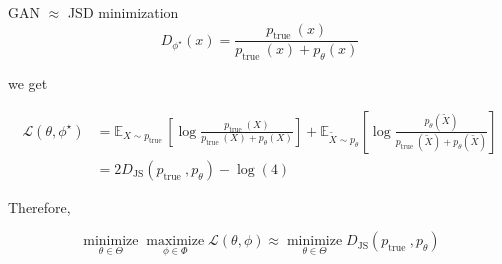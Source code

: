 \begin{frame}[allowframebreaks]
\begin{myconceptblock}{12.17}{GAN $\approx$ JSD minimization}
    $$
    D_{\phi^{\star}}(x)=\frac{p_{\text {true }}(x)}{p_{\text {true }}(x)+p_{\theta}(x)}
    $$

    we get

    $$
    \begin{aligned}
    \mathcal{L}\left(\theta, \phi^{\star}\right) & =\mathbb{E}_{X \sim p_{\text {true }}}\left[\log \frac{p_{\text {true }}(X)}{p_{\text {true }}(X)+p_{\theta}(X)}\right]+\mathbb{E}_{\tilde{X} \sim p_{\theta}}\left[\log \frac{p_{\theta}(\tilde{X})}{p_{\text {true }}(\tilde{X})+p_{\theta}(\tilde{X})}\right] \\
    & =2 D_{\mathrm{JS}}\left(p_{\text {true }}, p_{\theta}\right)-\log (4)
    \end{aligned}
    $$

    Therefore,

    $$
    \underset{\theta \in \Theta}{\operatorname{minimize}} \underset{\phi \in \Phi}{\operatorname{maximize}} \mathcal{L}(\theta, \phi) \approx \underset{\theta \in \Theta}{\operatorname{minimize}} D_{\mathrm{JS}}\left(p_{\text {true }}, p_{\theta}\right)
    $$
\end{myconceptblock}

\end{frame}


\begin{frame}[allowframebreaks]

\par\noindent\textcolor{gray}{\hdashrule{\textwidth}{0.4pt}{1pt 2pt}}

\end{frame}


